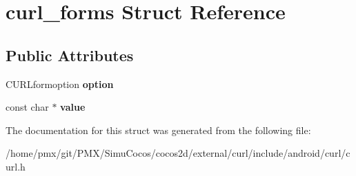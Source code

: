 \hypertarget{structcurl__forms}{}\section{curl\+\_\+forms Struct Reference}
\label{structcurl__forms}
\subsection*{Public Attributes}
\begin{DoxyCompactItemize}
\item 
\mbox{\label{structcurl__forms_a10acf738004892eb1663e560af087aa7}} 
C\+U\+R\+Lformoption {\bfseries option}
\item 
\mbox{\label{structcurl__forms_acccb2e87ff9e0f79e84586177343ede6}} 
const char $\ast$ {\bfseries value}
\end{DoxyCompactItemize}


The documentation for this struct was generated from the following file\+:\begin{DoxyCompactItemize}
\item 
/home/pmx/git/\+P\+M\+X/\+Simu\+Cocos/cocos2d/external/curl/include/android/curl/curl.\+h\end{DoxyCompactItemize}
